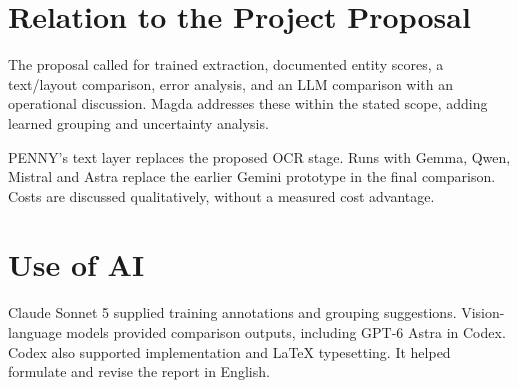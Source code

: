 \section{Relation to the Project Proposal}\label{app:proposal}
The proposal called for trained extraction, documented entity scores, a text/layout comparison, error analysis, and an LLM comparison with an operational discussion. Magda addresses these within the stated scope, adding learned grouping and uncertainty analysis.

PENNY's text layer replaces the proposed OCR stage. Runs with Gemma, Qwen, Mistral and Astra replace the earlier Gemini prototype in the final comparison. Costs are discussed qualitatively, without a measured cost advantage.

\section{Use of AI}
Claude Sonnet 5 supplied training annotations and grouping suggestions. Vision-language models provided comparison outputs, including GPT-6 Astra in Codex. Codex also supported implementation and LaTeX typesetting. It helped formulate and revise the report in English.
